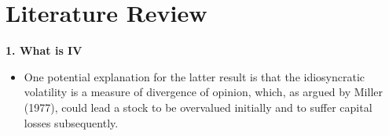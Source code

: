 \chapter{Literature Review}


\textbf{1. What is IV}
\begin{itemize}
    \item One potential explanation for the latter result is that the idiosyncratic volatility is a measure of divergence of opinion, which, as argued by Miller (1977), could lead a stock to be overvalued initially and to suffer capital losses subsequently.
\end{itemize}

